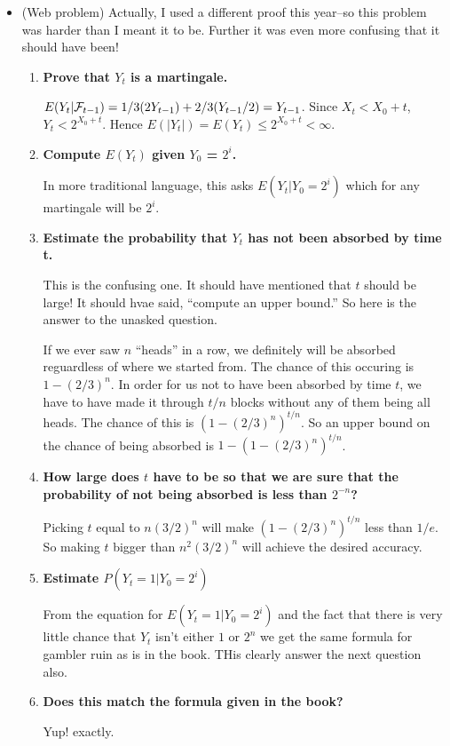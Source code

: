 \documentclass{article}
\begin{document}
\begin{itemize}
\item (Web problem) Actually, I used a different proof this year--so
this problem was harder than I meant it to be.  Further it was even
more confusing that it should have been!

\begin{enumerate}
\item  {\bf Prove that $Y_t$ is a martingale.}

$E(Y_t|{\cal F}_{t-1}) = 1/3 (2 Y_{t-1}) + 2/3 (Y_{t-1}/2) =
Y_{t-1}$.  Since $X_t < X_0 + t$, $Y_t < 2^{X_0 + t}$.  Hence $E(|Y_t|) 
= E(Y_t) \le 2^{X_0 + t} < \infty$.

\item  {\bf Compute $E(Y_t)$ given $Y_0$ = $2^i$.}

In more traditional language, this asks $E(Y_t|Y_0=2^i)$ which for any
martingale will be $2^i$.

\item  {\bf Estimate the probability that $Y_t$ has not been
 absorbed by time t.}

This is the confusing one.  It should have mentioned that $t$ should
be large!  It should hvae said, ``compute an upper bound.''  So here
is the answer to the unasked question.

If we ever saw $n$ ``heads'' in a row, we definitely will be absorbed
reguardless of where we started from.  The chance of this occuring is
$1 - (2/3)^n$.  In order for us not to have been absorbed by time $t$,
we have to have made it through $t/n$ blocks without any of them being
all heads.  The chance of this is $(1 - (2/3)^n)^{t/n}$.  So an upper
bound on the chance of being absorbed is $1 - (1 - (2/3)^n)^{t/n}$. 

\item  {\bf How large does $t$ have to be so that we are sure that the
             probability of not being absorbed is less than $2^{-n}$?}

Picking $t$ equal to $n(3/2)^n$ will make  $(1 - (2/3)^n)^{t/n}$ less
than $1/e$. So making $t$ bigger than $n^2(3/2)^n$ will achieve the
desired accuracy.

\item  {\bf Estimate $P(Y_t = 1|Y_0 = 2^i)$}

From the equation for $E(Y_t = 1|Y_0 = 2^i)$ and the fact that there
is very little chance that $Y_t$ isn't either $1$ or $2^n$ we get the
same formula for gambler ruin as is in the book.  THis clearly answer
the next question also.

        \item {\bf  Does this match the formula given in the book?}

Yup! exactly.
\end{enumerate}

\end{itemize}
\end{document}
